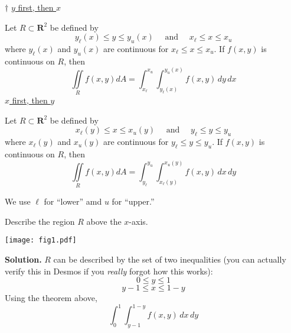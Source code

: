 \begin{Theorem}{$ \dagger $}{}
    \underline{$ y $ first, then $ x $}

    Let $ R\subset \mathbf{R}^2 $ be defined by
    \[ y_\ell(x)\le y\le y_u(x)\quad\text{ and }\quad
        x_{\ell}\le x\le x_u \]
    where $ y_{\ell}(x) $ and $ y_u(x) $ are continuous
    for $ x_{\ell}\le x\le x_u $. If $ f(x,y) $
    is continuous on $ R $, then
    \[ \iint\limits_{R}f(x,y)dA=
        \int_{x_\ell}^{x_u} \int_{y_\ell(x)}^{y_u(x)} f(x,y)\, d{y} \, d{x}  \]
    \underline{$ x $ first, then $ y $}

    Let $ R\subset \mathbf{R}^2 $ be defined by
    \[ x_\ell(y)\le x\le x_u(y)\quad\text{ and }\quad
        y_{\ell}\le y\le y_u \]
    where $ x_{\ell}(y) $ and $ x_u(y) $ are continuous
    for $ y_{\ell}\le y\le y_u $. If $ f(x,y) $
    is continuous on $ R $, then
    \[ \iint\limits_{R}f(x,y)dA=
        \int_{y_\ell}^{y_u} \int_{x_\ell(y)}^{x_u(y)} f(x,y)\, d{x} \, d{y}  \]
\end{Theorem}
We use $ \ell $ for ``lower'' amd $ u $ for ``upper.''
\begin{Example}{}{}
    Describe the region $ R $ above the $ x $-axis.
    \begin{center}
        \texttt{[image: fig1.pdf]}
    \end{center}
    \textbf{Solution.} $ R $ can be described by the set of two inequalities
    (you can actually verify this in Desmos if you \emph{really} forgot how this works):
    \[ 0\le y\le 1 \]
    \[ y-1\le x\le 1-y \]
    Using the theorem above,
    \[ \int_{0}^{1} \int_{y-1}^{1-y} f(x,y)\, d{x}\, d{y}  \]
\end{Example}
